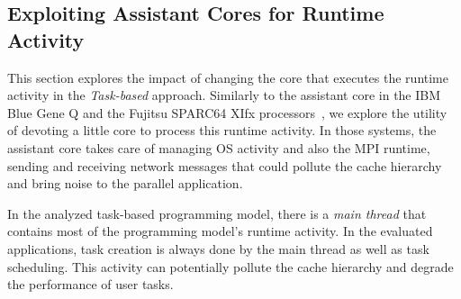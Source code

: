 






\subsection{Exploiting Assistant Cores for Runtime Activity}

This section explores the impact of changing the core that executes the runtime activity in the \emph{Task-based} approach. Similarly to the assistant core in the IBM Blue Gene Q and the Fujitsu SPARC64 XIfx processors~\cite{BG-Q:HotChips2011, Fujitsu:HotChips2014}, we explore the utility of devoting a little core to process this runtime activity. In those systems, the assistant core takes care of managing OS activity and also the MPI runtime, sending and receiving network messages that could pollute the cache hierarchy and bring noise to the parallel application.

In the analyzed task-based programming model, there is a \emph{main thread} that contains most of the programming model's runtime activity. In the evaluated applications, task creation is always done by the main thread as well as task scheduling. This activity can potentially pollute the cache hierarchy and degrade the performance of user tasks. 

